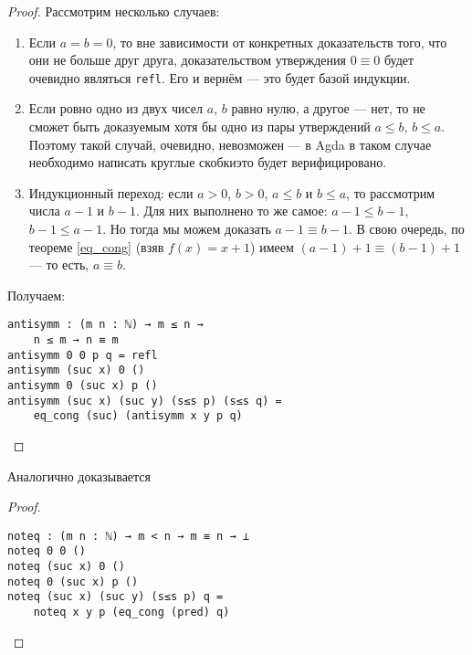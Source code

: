 

\begin{proof}
Рассмотрим несколько случаев:

\begin{enumerate}
\item Если $a=b=0$, то вне зависимости от конкретных доказательств того, что они не больше друг друга, доказательством утверждения $0 \equiv 0$ будет очевидно являться {\tt refl}. Его и вернём — это будет базой индукции.

\item Если ровно одно из двух чисел $a$, $b$ равно нулю, а другое — нет, то не сможет быть доказуемым хотя бы одно из пары утверждений $a \le b$, $b \le a$. Поэтому такой случай, очевидно, невозможен — в Agda в таком случае необходимо написать круглые скобки\scolon это будет верифицировано.

\item Индукционный переход: если $a>0$, $b>0$, $a\le b$ и $b \le a$, то рассмотрим числа $a-1$ и $b-1$. Для них выполнено то же самое: $a-1 \le b-1$, $b-1 \le a-1$. Но тогда мы можем доказать $a-1 \equiv b-1$. В свою очередь, по теореме \ref{eq_cong} (взяв $f(x) = x+1$) имеем $(a-1)+1 \equiv (b-1)+1$ — то есть, $a \equiv b$.
\end{enumerate}

Получаем:
\begin{verbatim}
antisymm : (m n : ℕ) → m ≤ n →
    n ≤ m → n ≡ m
antisymm 0 0 p q = refl
antisymm (suc x) 0 ()
antisymm 0 (suc x) p ()
antisymm (suc x) (suc y) (s≤s p) (s≤s q) =
    eq_cong (suc) (antisymm x y p q)
\end{verbatim}
\end{proof}

Аналогично доказывается


\begin{proof}
\ \begin{verbatim}
noteq : (m n : ℕ) → m < n → m ≡ n → ⊥
noteq 0 0 ()
noteq (suc x) 0 ()
noteq 0 (suc x) p ()
noteq (suc x) (suc y) (s≤s p) q =
    noteq x y p (eq_cong (pred) q)
\end{verbatim}
\end{proof}